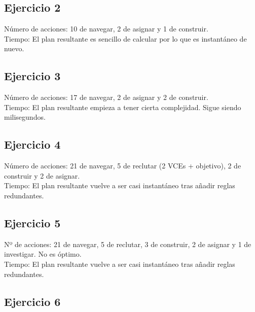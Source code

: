 \subsection{Ejercicio 2}
\noindent{}


Número de acciones: 10 de navegar, 2 de asignar y 1 de construir.\\
Tiempo: El plan resultante es sencillo de calcular por lo que es instantáneo de nuevo.

\subsection{Ejercicio 3}
\noindent{}


Número de acciones: 17 de navegar, 2 de asignar y 2 de construir.\\
Tiempo: El plan resultante empieza a tener cierta complejidad. Sigue siendo milisegundos.

\subsection{Ejercicio 4}
\noindent{}



Número de acciones: 21 de navegar, 5 de reclutar (2 VCEs + objetivo), 2 de construir y 2 de asignar.\\
Tiempo: El plan resultante vuelve a ser casi instantáneo tras añadir reglas redundantes.

\subsection{Ejercicio 5}
\noindent{}



Nº de acciones: 21 de navegar, 5 de reclutar, 3 de construir, 2 de asignar y 1 de investigar. No es óptimo.\\
Tiempo: El plan resultante vuelve a ser casi instantáneo tras añadir reglas redundantes.

\subsection{Ejercicio 6}
\noindent{}

